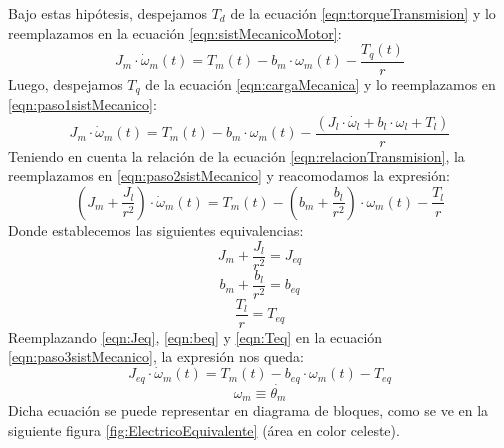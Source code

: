 \documentclass[10pt]{article}
\begin{document}
\begin{itemize}
	Bajo estas hipótesis, despejamos $T_{d}$ de la ecuación \ref{eqn:torqueTransmision} y lo reemplazamos en la ecuación \ref{eqn:sistMecanicoMotor}:
	\begin{equation}
		\label{eqn:paso1sistMecanico}
		J_{m}\cdot \dot{\omega }_{m}\left ( t \right )=T_{m}\left ( t \right )-b_{m}\cdot \omega_{m}\left ( t \right )-\frac{T_{q}\left ( t \right )}{r}
	\end{equation}
	Luego, despejamos $T_{q}$ de la ecuación \ref{eqn:cargaMecanica} y lo reemplazamos en \ref{eqn:paso1sistMecanico}:
	\begin{equation}
		\label{eqn:paso2sistMecanico}
		J_{m}\cdot \dot{\omega }_{m}\left ( t \right )=T_{m}\left ( t \right )-b_{m}\cdot \omega_{m}\left ( t \right )-\frac{\left ( J_{l}\cdot \dot{\omega_{l}}+b_{l}\cdot \omega_{l}+T_{l} \right )}{r}
	\end{equation}
	Teniendo en cuenta la relación de la ecuación \ref{eqn:relacionTransmision}, la reemplazamos en \ref{eqn:paso2sistMecanico} y reacomodamos la expresión:
	\begin{equation}
		\label{eqn:paso3sistMecanico}
		\left ( J_{m}+\frac{J_{l}}{r^{2}} \right )\cdot \dot{\omega }_{m}\left ( t \right )=T_{m}\left ( t \right )-\left ( b_{m}+\frac{b_{l}}{r^{2}} \right )\cdot \omega_{m}\left ( t \right )-\frac{T_{l}}{r}
	\end{equation}
	Donde establecemos las siguientes equivalencias:
	\begin{equation}
		\label{eqn:Jeq}
		J_{m}+\frac{J_{l}}{r^{2}}=J_{eq}
	\end{equation}
	\begin{equation}
		\label{eqn:beq}
		b_{m}+\frac{b_{l}}{r^{2}}=b_{eq}
	\end{equation}
	\begin{equation}
		\label{eqn:Teq}
		\frac{T_{l}}{r}=T_{eq}
	\end{equation}
	Reemplazando \ref{eqn:Jeq}, \ref{eqn:beq} y \ref{eqn:Teq} en la ecuación \ref{eqn:paso3sistMecanico}, la expresión nos queda:
	\begin{equation}
		\label{sist:mecanico}
		J_{eq}\cdot \dot{\omega }_{m}\left ( t \right )=T_{m}\left ( t \right )-b_{eq}\cdot \omega_{m}\left ( t \right )-T_{eq}
	\end{equation}
	\begin{equation}
		\label{globalNL:omegaM}
		\omega_{m} \equiv \dot{\theta_{m}}
	\end{equation}
	Dicha ecuación se puede representar en diagrama de bloques, como se ve en la siguiente figura \ref{fig:ElectricoEquivalente} (área en color celeste).

\end{itemize}
\end{document}
